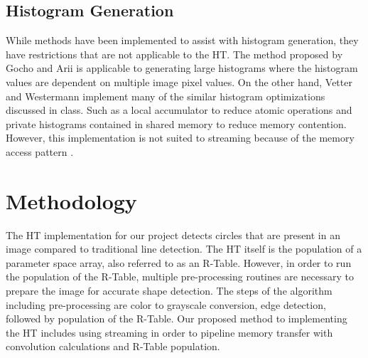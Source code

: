\documentclass[conference]{IEEEtran}
\begin{document}
\subsection{Histogram Generation}
While methods have been implemented to assist with histogram generation, they have restrictions that are not applicable to the HT. 
The method proposed by Gocho and Arii\cite{9324376} is applicable to generating large histograms where the histogram values are dependent on multiple image pixel values.
On the other hand, Vetter and Westermann implement many of the similar histogram optimizations discussed in class.
Such as a local accumulator to reduce atomic operations and private histograms contained in shared memory to reduce memory contention. 
However, this implementation is not suited to streaming because of the memory access pattern \cite{5872623}. 


\section{Methodology}
The HT implementation for our project detects circles that are present in an image compared to traditional line detection.
The HT itself is the population of a parameter space array, also referred to as an R-Table.
However, in order to run the population of the R-Table, multiple pre-processing routines are necessary to prepare the image for accurate shape detection.
The steps of the algorithm including pre-processing are color to grayscale conversion, edge detection, followed by population of the R-Table.
Our proposed method to implementing the HT includes using streaming in order to pipeline memory transfer with convolution calculations and R-Table population.
\end{document}
